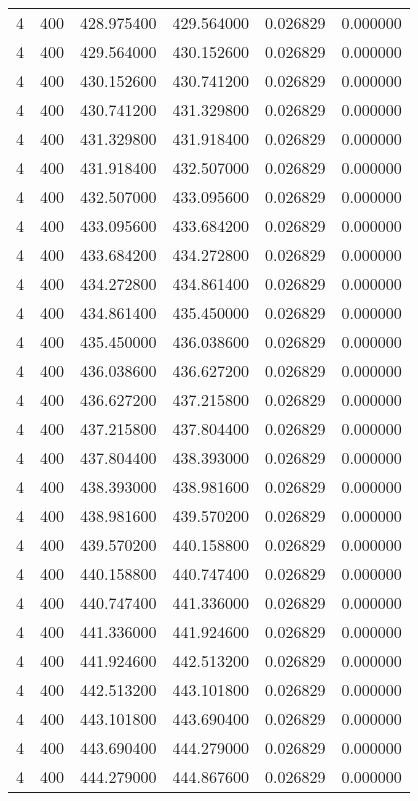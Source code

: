 \begin{longtable}{rrrrrr}
4 & 400 & 428.975400 & 429.564000 & 0.026829 & 0.000000 \\
4 & 400 & 429.564000 & 430.152600 & 0.026829 & 0.000000 \\
4 & 400 & 430.152600 & 430.741200 & 0.026829 & 0.000000 \\
4 & 400 & 430.741200 & 431.329800 & 0.026829 & 0.000000 \\
4 & 400 & 431.329800 & 431.918400 & 0.026829 & 0.000000 \\
4 & 400 & 431.918400 & 432.507000 & 0.026829 & 0.000000 \\
4 & 400 & 432.507000 & 433.095600 & 0.026829 & 0.000000 \\
4 & 400 & 433.095600 & 433.684200 & 0.026829 & 0.000000 \\
4 & 400 & 433.684200 & 434.272800 & 0.026829 & 0.000000 \\
4 & 400 & 434.272800 & 434.861400 & 0.026829 & 0.000000 \\
4 & 400 & 434.861400 & 435.450000 & 0.026829 & 0.000000 \\
4 & 400 & 435.450000 & 436.038600 & 0.026829 & 0.000000 \\
4 & 400 & 436.038600 & 436.627200 & 0.026829 & 0.000000 \\
4 & 400 & 436.627200 & 437.215800 & 0.026829 & 0.000000 \\
4 & 400 & 437.215800 & 437.804400 & 0.026829 & 0.000000 \\
4 & 400 & 437.804400 & 438.393000 & 0.026829 & 0.000000 \\
4 & 400 & 438.393000 & 438.981600 & 0.026829 & 0.000000 \\
4 & 400 & 438.981600 & 439.570200 & 0.026829 & 0.000000 \\
4 & 400 & 439.570200 & 440.158800 & 0.026829 & 0.000000 \\
4 & 400 & 440.158800 & 440.747400 & 0.026829 & 0.000000 \\
4 & 400 & 440.747400 & 441.336000 & 0.026829 & 0.000000 \\
4 & 400 & 441.336000 & 441.924600 & 0.026829 & 0.000000 \\
4 & 400 & 441.924600 & 442.513200 & 0.026829 & 0.000000 \\
4 & 400 & 442.513200 & 443.101800 & 0.026829 & 0.000000 \\
4 & 400 & 443.101800 & 443.690400 & 0.026829 & 0.000000 \\
4 & 400 & 443.690400 & 444.279000 & 0.026829 & 0.000000 \\
4 & 400 & 444.279000 & 444.867600 & 0.026829 & 0.000000 \\

\end{longtable}

